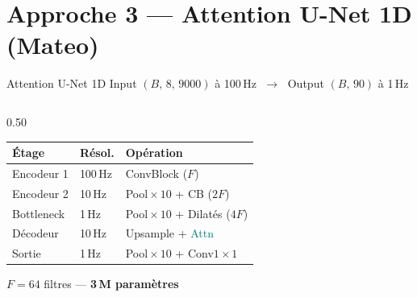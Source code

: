\documentclass[aspectratio=169, 10pt]{beamer}
\begin{document}

\section{Approche 3 --- Attention U-Net 1D (Mateo)}

\begin{frame}{Attention U-Net 1D}
    \small Input $(B,\,8,\,9000)$ à 100\,Hz $\;\longrightarrow\;$ Output $(B,\,90)$ à 1\,Hz

    \vspace{0.2cm}
    \begin{columns}[T]
        \begin{column}{0.50\textwidth}
            \small
            \begin{tabular}{@{}lll@{}}
                \toprule
                \textbf{Étage} & \textbf{Résol.} & \textbf{Opération} \\
                \midrule
                Encodeur 1   & 100\,Hz & ConvBlock ($F$) \\
                Encodeur 2   & 10\,Hz  & Pool$\!\times\!10$ + CB ($2F$) \\
                Bottleneck   & 1\,Hz   & Pool$\!\times\!10$ + Dilatés ($4F$) \\
                Décodeur     & 10\,Hz  & Upsample + \textcolor{Teal}{Attn} \\
                Sortie       & 1\,Hz   & Pool$\!\times\!10$ + Conv$1\!\times\!1$ \\
                \bottomrule
            \end{tabular}
            \vspace{0.15cm}

            \textcolor{MidGray}{\small $F = 64$ filtres --- \textbf{3\,M paramètres}}


\end{column}
\end{columns}
\end{frame}
\end{document}
